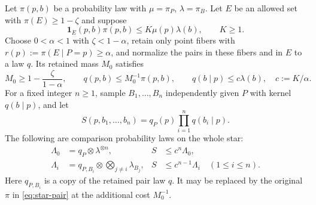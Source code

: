 \begin{theorem}
\label{thm:finite-conditioning}
Let $\pi(p,b)$ be a probability law with
$\mu=\pi_P$, $\lambda=\pi_B$.  Let $E$ be an allowed set with
$\pi(E)\ge1-\zeta$ and suppose
\begin{equation}
 \boldsymbol1_E(p,b)\pi(p,b)\le K\mu(p)\lambda(b),\qquad K\ge1.
 \label{eq:pair-product}
\end{equation}
Choose $0<\alpha<1$ with $\zeta<1-\alpha$, retain only point fibers
with $r(p):=\pi(E\mid P=p)\ge\alpha$, and normalize the pairs in
these fibers and in $E$ to a law $q$.  Its retained mass $M_0$ satisfies
\begin{equation}
 M_0\ge1-\frac{\zeta}{1-\alpha},\qquad
 q(p,b)\le M_0^{-1}\pi(p,b),\qquad
 q(b\mid p)\le c\lambda(b),\quad c:=K/\alpha.
 \label{eq:star-kernel}
\end{equation}
For a fixed integer $n\ge1$, sample $B_1,\ldots,B_n$
independently given $P$ with kernel $q(b\mid p)$, and let
\[
 S(p,b_1,\ldots,b_n)=q_P(p)\prod_{i=1}^nq(b_i\mid p).
\]
The following are comparison probability laws on the whole star:
\begin{align}
 \Lambda_0&=q_P\otimes\lambda^{\otimes n},
 &S&\le c^n\Lambda_0,\label{eq:star-independent}\\
 \Lambda_i&=q_{P,B_i}\otimes\bigotimes_{j\ne i}\lambda_{B_j},
 &S&\le c^{n-1}\Lambda_i\quad(1\le i\le n).
 \label{eq:star-pair}
\end{align}
Here $q_{P,B_i}$ is a copy of the retained pair law $q$.
It may be replaced by the original $\pi$ in
\eqref{eq:star-pair} at the additional cost $M_0^{-1}$.


\end{theorem}
